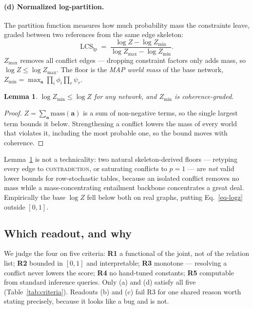\documentclass{article} %
\newtheorem{lemma}{Lemma}
\newcommand{\coupling}[1]{\textsc{#1}}          %
\newcommand{\LCS}{\mathrm{LCS}}
\newcommand{\readout}[1]{\ensuremath{\mathrm{#1}}}
\newcommand{\lp}{\readout{lp}}
\begin{document}
\paragraph{(d) Normalized log-partition.} The partition function measures how much probability
mass the constraints leave, graded between two references from the same edge skeleton:
\begin{equation}
\LCS_{\lp} \;=\; \frac{\log Z - \log Z_{\min}}{\log Z_{\max} - \log Z_{\min}} .
\label{eq-logz}
\end{equation}
$Z_{\max}$ removes all conflict edges --- dropping constraint factors only adds mass, so
$\log Z\le\log Z_{\max}$. The floor is the \emph{MAP world mass} of the base network,
$Z_{\min}=\max_{\mathbf{a}}\prod_i\phi_i\prod_r\psi_r$.

\begin{lemma}
\label{lem-floor}
$\log Z_{\min}\le \log Z$ for any network, and $Z_{\min}$ is coherence-graded.
\end{lemma}
\begin{proof}
$Z=\sum_{\mathbf{a}}\text{mass}(\mathbf{a})$ is a sum of non-negative terms, so the single
largest term bounds it below. Strengthening a conflict lowers the mass of every world that
violates it, including the most probable one, so the bound moves with coherence.
\end{proof}

Lemma~\ref{lem-floor} is not a technicality: two natural skeleton-derived floors --- retyping
every edge to \coupling{contradiction}, or saturating conflicts to $p=1$ --- are \emph{not}
valid lower bounds for row-stochastic tables, because an isolated conflict removes no mass while
a mass-concentrating entailment backbone concentrates a great deal. Empirically the base
$\log Z$ fell below both on real graphs, putting Eq.~\ref{eq-logz} outside $[0,1]$.

\subsection{Which readout, and why}

We judge the four on five criteria: \textbf{R1} a functional of the joint, not of the relation
list; \textbf{R2} bounded in $[0,1]$ and interpretable; \textbf{R3} monotone --- resolving a
conflict never lowers the score; \textbf{R4} no hand-tuned constants; \textbf{R5} computable
from standard inference queries. Only (a) and (d) satisfy all five
(Table~\ref{tab:criteria}). Readouts (b) and (c) fail R3 for one shared reason worth stating
precisely, because it looks like a bug and is not.
\end{document}
